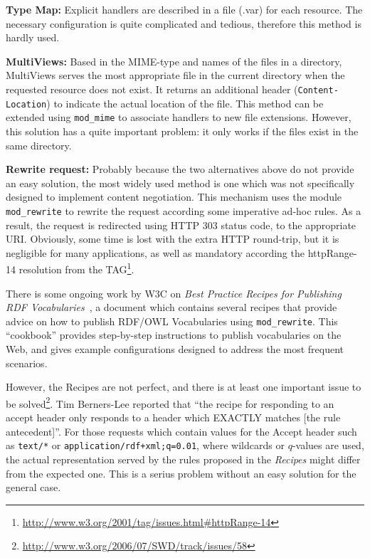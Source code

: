 \documentclass{../templates/llncs}
\begin{document}
\begin{description}

  \item \textbf{Type Map:} Explicit handlers are described in a file (.var) for 
        each resource. The necessary configuration is quite complicated and 
        tedious, therefore this method is hardly used.

  \item \textbf{MultiViews:} Based in the MIME-type and names of the files 
        in a directory, MultiViews serves the most appropriate file in the current 
        directory when the requested resource does not exist. It returns 
        an additional header (\texttt{Content-Location}) to indicate the actual 
        location of the file. This method can be extended using \texttt{mod\_mime} 
        to associate handlers to new file extensions. However, this solution
        has a quite important problem: it only works if the files exist in
        the same directory.

  \item \textbf{Rewrite request:} Probably because the two alternatives above
        do not provide an easy solution, the most widely used method is one 
        which was not specifically designed to implement content negotiation. 
        This mechanism uses the module \texttt{mod\_rewrite} to rewrite the 
        request according some imperative ad-hoc rules. As a result, the
        request is redirected using
        HTTP 303 status code, to the appropriate URI. Obviously,  
        some time is lost with the extra HTTP round-trip, but it is negligible for
        many applications,
        as well as mandatory according the httpRange-14 resolution from the
        TAG\footnote{\url{http://www.w3.org/2001/tag/issues.html#httpRange-14}}.

\end{description}

There is some ongoing work by W3C on \textit{Best Practice Recipes for Publishing 
RDF Vocabularies}~\cite{Recipes}, a document which contains several recipes that provide advice on how 
to publish RDF/OWL Vocabularies using \texttt{mod\_rewrite}. This ``cookbook'' 
provides step-by-step instructions to publish vocabularies on the Web, and gives
example configurations designed to address the most frequent scenarios.

However, the Recipes are not perfect, and there is at least one important issue to 
be solved\footnote{\url{http://www.w3.org/2006/07/SWD/track/issues/58}}.
Tim Berners-Lee reported that ``the recipe for responding to an accept 
header only responds to a header which EXACTLY matches [the rule antecedent]''.
For those requests which contain values for the Accept header such as 
\texttt{text/*} or \texttt{application/rdf+xml;q=0.01}, where wildcards or
$q$-values are used, the actual representation served by the
rules proposed in the \textit{Recipes} might differ from the expected one. This is a serius problem 
without an easy solution for the general case.
\end{document}

